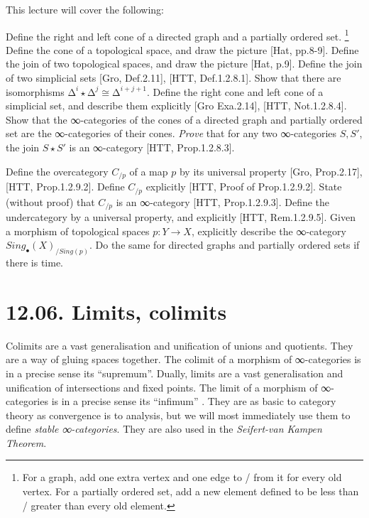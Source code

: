 \documentclass[a4paper]{amsart}
\numberwithin{figure}{section}
\theoremstyle{theorem}
\theoremstyle{definition}
\begin{document}
This lecture will cover the following: 

Define the right and left cone of a directed graph and a partially ordered set.%
\footnote{For a graph, add one extra vertex and one edge to / from it for every old vertex. For a partially ordered set, add a new element defined to be less than / greater than every old element.} %
Define the cone of a topological space, and draw the picture [Hat, pp.8-9]. %
Define the join of two topological spaces, and draw the picture [Hat, p.9]. %
Define the join of two simplicial sets [Gro, Def.2.11], [HTT, Def.1.2.8.1]. %
Show that there are isomorphisms $∆^{i} {\star} ∆^{j} \cong ∆^{i+j+1}$. %
Define the right cone and left cone of a simplicial set, and describe them explicitly [Gro Exa.2.14], [HTT, Not.1.2.8.4]. %
Show that the ∞-categories of the cones of a directed graph and partially ordered set are the ∞-categories of their cones. %
\emph{Prove} that for any two ∞-categories $S, S'$, the join $S \star S'$ is an ∞-category [HTT, Prop.1.2.8.3]. %

Define the overcategory  $C_{/p}$ of a map $p$ by its universal property [Gro, Prop.2.17], [HTT, Prop.1.2.9.2]. %
Define $C_{/p}$  explicitly [HTT, Proof of Prop.1.2.9.2]. %
State (without proof) that $C_{/p}$ is an ∞-category [HTT, Prop.1.2.9.3]. %
Define the undercategory by a universal property, and explicitly [HTT, Rem.1.2.9.5]. %
Given a morphism of topological spaces $p: Y \to X$, explicitly describe the ∞-category $Sing_\bullet(X)_{/Sing(p)}$. %
Do the same for directed graphs and partially ordered sets if there is time.



\section{12.06. Limits, colimits}

Colimits are a vast generalisation and unification of unions and quotients. They are a way of gluing spaces together. The colimit of a morphism of ∞-categories is in a precise sense its ``supremum''. %
Dually, limits are a vast generalisation and unification of intersections and fixed points. The limit of a morphism of ∞-categories is in a precise sense its ``infimum'' . %
They are as basic to category theory as convergence is to analysis, but we will most immediately use them to define \emph{stable ∞-categories}. %
They are also used in the \emph{Seifert-van Kampen Theorem}.
\end{document}
